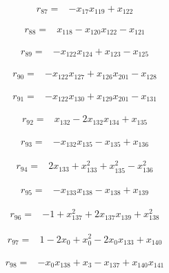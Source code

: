 \documentclass[10pt,letterpaper]{article}
\theoremstyle{remark}\newtheorem{remark}[theorem]{Remark}
\begin{document}
\begin{align*}
r_{87}={}&-x_{17}x_{119}+x_{122}
\end{align*}

\begin{align*}
r_{88}={}&x_{118}-x_{120}x_{122}-x_{121}
\end{align*}

\begin{align*}
r_{89}={}&-x_{122}x_{124}+x_{123}-x_{125}
\end{align*}

\begin{align*}
r_{90}={}&-x_{122}x_{127}+x_{126}x_{201}-x_{128}
\end{align*}

\begin{align*}
r_{91}={}&-x_{122}x_{130}+x_{129}x_{201}-x_{131}
\end{align*}

\begin{align*}
r_{92}={}&x_{132}-2x_{132}x_{134}+x_{135}
\end{align*}

\begin{align*}
r_{93}={}&-x_{132}x_{135}-x_{135}+x_{136}
\end{align*}

\begin{align*}
r_{94}={}&2x_{133}+x_{133}^{2}+x_{135}^{2}-x_{136}^{2}
\end{align*}

\begin{align*}
r_{95}={}&-x_{133}x_{138}-x_{138}+x_{139}
\end{align*}

\begin{align*}
r_{96}={}&-1+x_{137}^{2}+2x_{137}x_{139}+x_{138}^{2}
\end{align*}

\begin{align*}
r_{97}={}&1-2x_{0}+x_{0}^{2}-2x_{0}x_{133}+x_{140}
\end{align*}

\begin{align*}
r_{98}={}&-x_{0}x_{138}+x_{3}-x_{137}+x_{140}x_{141}
\end{align*}
\end{document}
